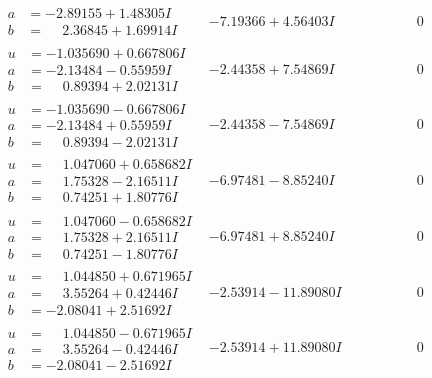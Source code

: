 \documentclass[1p]{elsarticle_modified}
\theoremstyle{definition}
\begin{document}
$$\begin{array}{c|c|c}
\begin{aligned}
a &= -2.89155 + 1.48305 I \\
b &= \phantom{-}2.36845 + 1.69914 I\end{aligned}
 & -7.19366 + 4.56403 I & \phantom{-0.000000 } 0 \\ \hline\begin{aligned}
u &= -1.035690 + 0.667806 I \\
a &= -2.13484 - 0.55959 I \\
b &= \phantom{-}0.89394 + 2.02131 I\end{aligned}
 & -2.44358 + 7.54869 I & \phantom{-0.000000 } 0 \\ \hline\begin{aligned}
u &= -1.035690 - 0.667806 I \\
a &= -2.13484 + 0.55959 I \\
b &= \phantom{-}0.89394 - 2.02131 I\end{aligned}
 & -2.44358 - 7.54869 I & \phantom{-0.000000 } 0 \\ \hline\begin{aligned}
u &= \phantom{-}1.047060 + 0.658682 I \\
a &= \phantom{-}1.75328 - 2.16511 I \\
b &= \phantom{-}0.74251 + 1.80776 I\end{aligned}
 & -6.97481 - 8.85240 I & \phantom{-0.000000 } 0 \\ \hline\begin{aligned}
u &= \phantom{-}1.047060 - 0.658682 I \\
a &= \phantom{-}1.75328 + 2.16511 I \\
b &= \phantom{-}0.74251 - 1.80776 I\end{aligned}
 & -6.97481 + 8.85240 I & \phantom{-0.000000 } 0 \\ \hline\begin{aligned}
u &= \phantom{-}1.044850 + 0.671965 I \\
a &= \phantom{-}3.55264 + 0.42446 I \\
b &= -2.08041 + 2.51692 I\end{aligned}
 & -2.53914 - 11.89080 I & \phantom{-0.000000 } 0 \\ \hline\begin{aligned}
u &= \phantom{-}1.044850 - 0.671965 I \\
a &= \phantom{-}3.55264 - 0.42446 I \\
b &= -2.08041 - 2.51692 I\end{aligned}
 & -2.53914 + 11.89080 I & \phantom{-0.000000 } 0 \\ \hline\begin{aligned}

\end{aligned}
\end{array}$$
\end{document}
